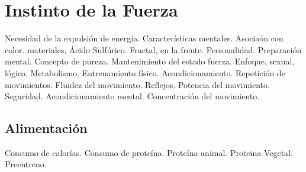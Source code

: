 \chapter*{Instinto de la Fuerza}
Necesidad de la expulsión de energía.
Características mentales. Asociaón con color. materiales, Ácido Sulfúrico. Fractal, en la frente.
Personalidad. Preparación mental.
Concepto de pureza.
Mantenimiento del estado fuerza.
Enfoque, sexual, lógico.
Metabolismo.
Entrenamiento físico. Acondicionamiento. Repetición de movimientos.
Fluidez del movimiento.
Reflejos. Potencia del movimiento. Seguridad. Acondicionamiento mental.
Concentración del movimiento.
\section*{Alimentación}
Consumo de calorías.
Consumo de proteína. Proteína animal. Proteina Vegetal.
Preentreno.
\\